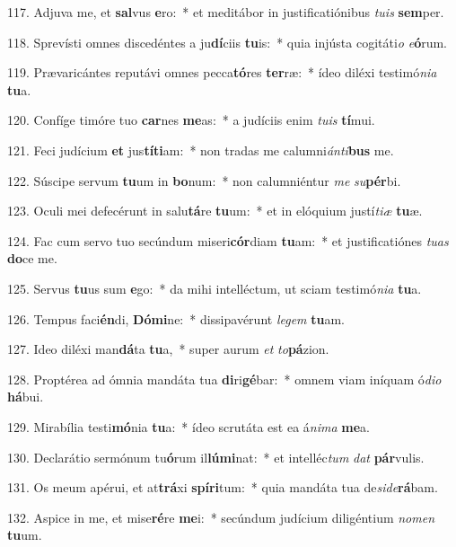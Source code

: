 117. Adjuva me, et \textbf{sal}vus \textbf{e}ro:~*  et meditábor in justificatiónibus \textit{tu}\textit{is} \textbf{sem}per.\

118. Sprevísti omnes discedéntes a ju\textbf{dí}ciis \textbf{tu}is:~*  quia injústa cogitáti\textit{o} \textit{e}\textbf{ó}rum.\

119. Prævaricántes reputávi omnes pecca\textbf{tó}res \textbf{ter}ræ:~*  ídeo diléxi testimó\textit{ni}\textit{a} \textbf{tu}a.\

120. Confíge timóre tuo \textbf{car}nes \textbf{me}as:~*  a judíciis enim \textit{tu}\textit{is} \textbf{tí}mui.\

121. Feci judícium \textbf{et} jus\textbf{tí}\textbf{ti}am:~*  non tradas me calumni\textit{án}\textit{ti}\textbf{bus} me.\

122. Súscipe servum \textbf{tu}um in \textbf{bo}num:~*  non calumniéntur \textit{me} \textit{su}\textbf{pér}bi.\

123. Oculi mei defecérunt in salu\textbf{tá}re \textbf{tu}um:~*  et in elóquium justí\textit{ti}\textit{æ} \textbf{tu}æ.\

124. Fac cum servo tuo secúndum miseri\textbf{cór}diam \textbf{tu}am:~*  et justificatiónes \textit{tu}\textit{as} \textbf{do}ce me.\

125. Servus \textbf{tu}us sum \textbf{e}go:~*  da mihi intelléctum, ut sciam testimó\textit{ni}\textit{a} \textbf{tu}a.\

126. Tempus faci\textbf{én}di, \textbf{Dó}\textbf{mi}ne:~*  dissipavérunt \textit{le}\textit{gem} \textbf{tu}am.\

127. Ideo diléxi man\textbf{dá}ta \textbf{tu}a,~*  super aurum \textit{et} \textit{to}\textbf{pá}zion.\

128. Proptérea ad ómnia mandáta tua \textbf{di}ri\textbf{gé}bar:~*  omnem viam iníquam ó\textit{di}\textit{o} \textbf{há}bui.\

129. Mirabília testi\textbf{mó}nia \textbf{tu}a:~*  ídeo scrutáta est ea á\textit{ni}\textit{ma} \textbf{me}a.\

130. Declarátio sermónum tu\textbf{ó}rum il\textbf{lú}\textbf{mi}nat:~*  et intelléc\textit{tum} \textit{dat} \textbf{pár}vulis.\

131. Os meum apérui, et at\textbf{trá}xi \textbf{spí}\textbf{ri}tum:~*  quia mandáta tua de\textit{si}\textit{de}\textbf{rá}bam.\

132. Aspice in me, et mise\textbf{ré}re \textbf{me}i:~*  secúndum judícium diligéntium \textit{no}\textit{men} \textbf{tu}um.\

